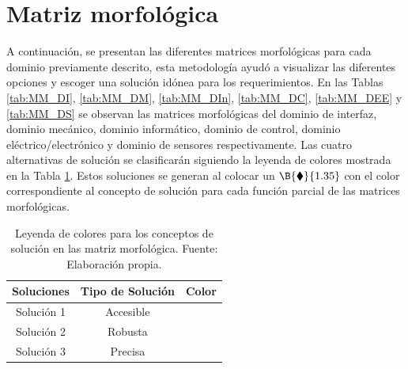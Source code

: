 \section{Matriz morfológica}

A continuación, se presentan las diferentes matrices morfológicas para cada dominio previamente descrito, esta metodología ayudó a visualizar las diferentes opciones y escoger una solución idónea para los requerimientos. En las Tablas \ref{tab:MM_DI}, \ref{tab:MM_DM}, \ref{tab:MM_DIn}, \ref{tab:MM_DC}, \ref{tab:MM_DEE} y \ref{tab:MM_DS} se observan las matrices morfológicas del dominio de interfaz, dominio mecánico, dominio informático, dominio de control, dominio eléctrico/electrónico y dominio de sensores respectivamente. 
Las cuatro alternativas de solución se clasificarán siguiendo la leyenda de colores mostrada en la Tabla \ref{tab:leyenda_colores_soluciones}. Estos soluciones se generan al colocar un $\B{\blacklozenge}{1.35}$ con el color correspondiente al concepto de solución para cada función parcial de las matrices morfológicas.

\begin{table}[H]
	\centering
	\caption[Leyenda de colores para los conceptos de solución en las matriz morfológica.]{Leyenda de colores para los conceptos de solución en las matriz morfológica. Fuente: Elaboración propia.}
	\begin{tabular}{|c|c|c|}
		\hline
		\textbf{Soluciones} & \textbf{Tipo de Solución} & \textbf{Color} \bigstrut\\
		\hline
		Solución 1 & Accesible & \cellcolor[rgb]{ 1,  0,  0} \bigstrut\\
		\hline
		Solución 2 & Robusta & \cellcolor[rgb]{ 0,  0,  1} \bigstrut\\
		\hline
		Solución 3 & Precisa & \cellcolor[rgb]{ .298,  .835,  .078} \bigstrut\\
		\hline
	\end{tabular}%
	\label{tab:leyenda_colores_soluciones}%
\end{table}



